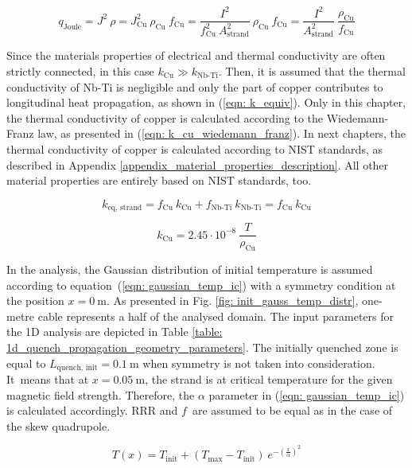 \begin{equation}
    q_\text{Joule} = J^2~\rho = J_\text{Cu}^2~\rho_\text{Cu}~f_\text{Cu} = \frac{I^2}{f_\text{Cu}^2~A_\text{strand}^2}~\rho_\text{Cu}~f_\text{Cu} = \frac{I^2}{A_\text{strand}^2}~\frac{\rho_\text{Cu}}{f_\text{Cu}} 
    \label{eqn: p_dens_equiv}
\end{equation}

Since the materials properties of electrical and thermal conductivity are often strictly connected, in this case $k_\text{Cu} \gg k_\text{Nb-Ti}$. Then, it is assumed that the thermal conductivity of Nb-Ti is negligible and only the part of copper contributes to longitudinal heat propagation, as shown in (\ref{eqn: k_equiv}). Only in this chapter, the thermal conductivity of copper is calculated according to the Wiedemann-Franz law, as presented in (\ref{eqn: k_cu_wiedemann_franz}). In next chapters, the thermal conductivity of copper is calculated according to NIST standards, as described in Appendix \ref{appendix_material_properties_description}. All other material properties are entirely based on NIST standards, too.

\begin{equation}
    k_\text{eq, strand} = f_\text{Cu} ~ k_\text{Cu} + f_\text{Nb-Ti} ~ k_\text{Nb-Ti} =  f_\text{Cu} ~ k_\text{Cu}
    \label{eqn: k_equiv}
\end{equation}

\begin{equation}
    k_\text{Cu} = 2.45 \cdot 10^{-8} ~ \frac{T}{\rho_\text{Cu}}
    \label{eqn: k_cu_wiedemann_franz}
\end{equation}

In the analysis, the Gaussian distribution of initial temperature is assumed according to equation~(\ref{eqn: gaussian_temp_ic}) with a symmetry condition at the position $x=0~\text{m}$. As presented in Fig. \ref{fig: init_gauss_temp_distr}, one-metre cable represents a half of the analysed domain. The input parameters for the 1D analysis are depicted in Table \ref{table: 1d_quench_propagation_geometry_parameters}. The initially quenched zone is equal to $L_\text{quench, init}= 0.1~\text{m}$ when symmetry is not taken into consideration. It~means that at $x=0.05~\text{m}$, the strand is at critical temperature for the given magnetic field strength. Therefore, the $\alpha$ parameter in (\ref{eqn: gaussian_temp_ic}) is calculated accordingly. RRR and $f$~are assumed to be equal as in the case of the skew quadrupole. 

\begin{equation}
    T(x) = T_\text{init} + (T_\text{max} - T_\text{init}) ~ e^{-(\frac{x}{\alpha})^2}
    \label{eqn: gaussian_temp_ic}
\end{equation}

